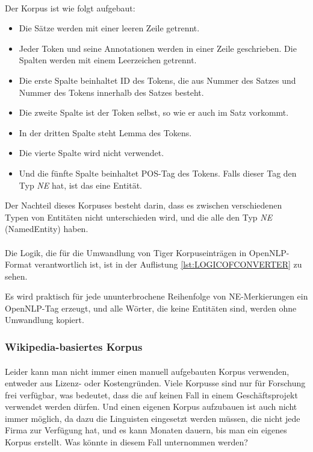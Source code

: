 \paragraph{}
Der Korpus ist wie folgt aufgebaut:
\begin{itemize}
\item Die Sätze werden mit einer leeren Zeile getrennt.
\item Jeder Token und seine Annotationen werden in einer Zeile geschrieben. Die Spalten werden mit einem Leerzeichen getrennt.
\item Die erste Spalte beinhaltet ID des Tokens, die aus Nummer des Satzes und Nummer des Tokens innerhalb des Satzes besteht.
\item Die zweite Spalte ist der Token selbst, so wie er auch im Satz vorkommt.
\item In der dritten Spalte steht Lemma des Tokens.
\item Die vierte Spalte wird nicht verwendet.
\item Und die fünfte Spalte beinhaltet POS-Tag des Tokens. Falls dieser Tag den Typ \textit{NE} hat, ist das eine Entität.
\end{itemize}

Der Nachteil dieses Korpuses besteht darin, dass es zwischen verschiedenen Typen von Entitäten nicht unterschieden wird, und die alle den Typ \textit{NE} (NamedEntity) haben.

\paragraph{}
Die Logik, die für die Umwandlung von Tiger Korpuseinträgen in OpenNLP-Format verantwortlich ist, ist in der Auflistung \ref{lst:LOGICOFCONVERTER} zu sehen.

Es wird praktisch für jede ununterbrochene Reihenfolge von NE-Merkierungen ein OpenNLP-Tag erzeugt, und alle Wörter, die keine Entitäten sind, werden ohne Umwandlung kopiert.

\subsubsection{Wikipedia-basiertes Korpus}
\paragraph{}
Leider kann man nicht immer einen manuell aufgebauten Korpus verwenden, entweder aus Lizenz- oder Kostengründen. Viele Korpusse sind nur für Forschung frei verfügbar, was bedeutet, dass 
die auf keinen Fall in einem Geschäftsprojekt verwendet werden dürfen. Und einen eigenen Korpus aufzubauen ist auch nicht immer möglich, da dazu die Linguisten eingesetzt werden müssen, die nicht jede Firma zur Verfügung hat, und es kann Monaten dauern, bis man ein eigenes Korpus erstellt. Was könnte in diesem Fall unternommen werden?

